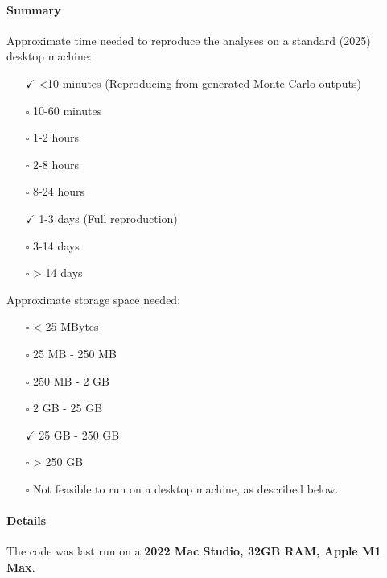 \documentclass[10pt]{article}
\providecommand{\tightlist}{%
  \setlength{\itemsep}{0pt}\setlength{\parskip}{0pt}}
\begin{document}
\hypertarget{summary}{%
\paragraph{Summary}\label{summary}}

Approximate time needed to reproduce the analyses on a standard (2025) desktop machine:

\begin{itemize}
\tightlist
\item[$\checkmark$]
  \textless10 minutes (Reproducing from generated Monte Carlo outputs)
\item[$\square$]
  10-60 minutes
\item[$\square$]
  1-2 hours
\item[$\square$]
  2-8 hours
\item[$\square$]
  8-24 hours
\item[$\checkmark$]
  1-3 days (Full reproduction)
\item[$\square$]
  3-14 days
\item[$\square$]
  \textgreater{} 14 days
\end{itemize}

Approximate storage space needed:

\begin{itemize}
\item[$\square$]
  \textless{} 25 MBytes
\item[$\square$]
  25 MB - 250 MB
\item[$\square$]
  250 MB - 2 GB
\item[$\square$]
  2 GB - 25 GB
\item[$\checkmark$]
  25 GB - 250 GB
\item[$\square$]
  \textgreater{} 250 GB
\item[$\square$]
  Not feasible to run on a desktop machine, as described below.
\end{itemize}

\hypertarget{details}{%
\paragraph{Details}\label{details}}

The code was last run on a \textbf{2022 Mac Studio, 32GB RAM, Apple M1 Max}.


\end{document}
